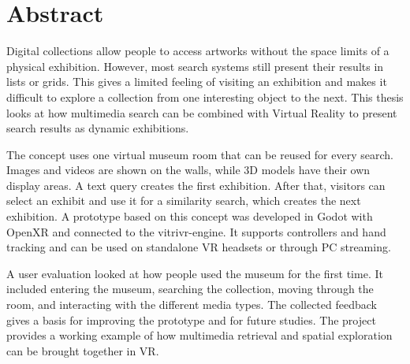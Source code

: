 \chapter{Abstract}

Digital collections allow people to access artworks without the space limits of a physical exhibition. However, most search systems still present their results in lists or grids. This gives a limited feeling of visiting an exhibition and makes it difficult to explore a collection from one interesting object to the next. This thesis looks at how multimedia search can be combined with Virtual Reality to present search results as dynamic exhibitions.

The concept uses one virtual museum room that can be reused for every search. Images and videos are shown on the walls, while 3D models have their own display areas. A text query creates the first exhibition. After that, visitors can select an exhibit and use it for a similarity search, which creates the next exhibition. A prototype based on this concept was developed in Godot with OpenXR and connected to the vitrivr-engine. It supports controllers and hand tracking and can be used on standalone VR headsets or through PC streaming.

A user evaluation looked at how people used the museum for the first time. It included entering the museum, searching the collection, moving through the room, and interacting with the different media types. The collected feedback gives a basis for improving the prototype and for future studies. The project provides a working example of how multimedia retrieval and spatial exploration can be brought together in VR.
